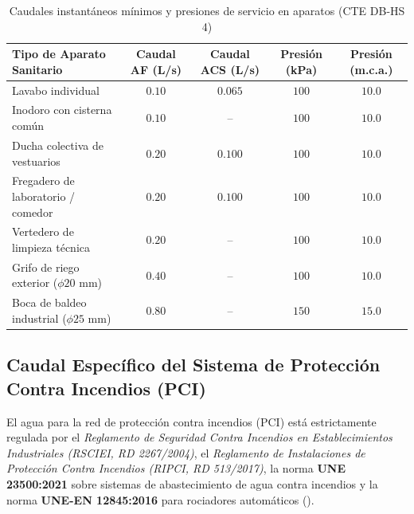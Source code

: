 \documentclass{report}
\begin{document}
\begin{table}[H]
    \centering
    \small
    \renewcommand{\arraystretch}{1.20}
    \caption{Caudales instantáneos mínimos y presiones de servicio en aparatos (CTE DB-HS 4)}
    \label{tab:caudales_aparatos_norma}
    \begin{tabularx}{\textwidth}{@{}X c c c c@{}}
        \toprule
        \textbf{Tipo de Aparato Sanitario} & \textbf{Caudal AF (L/s)} & \textbf{Caudal ACS (L/s)} & \textbf{Presión (kPa)} & \textbf{Presión (m.c.a.)} \\
        \midrule
        Lavabo individual & $0.10$ & $0.065$ & $100$ & $10.0$ \\
        Inodoro con cisterna común & $0.10$ & -- & $100$ & $10.0$ \\
        Ducha colectiva de vestuarios & $0.20$ & $0.100$ & $100$ & $10.0$ \\
        Fregadero de laboratorio / comedor & $0.20$ & $0.100$ & $100$ & $10.0$ \\
        Vertedero de limpieza técnica & $0.20$ & -- & $100$ & $10.0$ \\
        Grifo de riego exterior ($\phi 20\text{ mm}$) & $0.40$ & -- & $100$ & $10.0$ \\
        Boca de baldeo industrial ($\phi 25\text{ mm}$) & $0.80$ & -- & $150$ & $15.0$ \\
        \bottomrule
    \end{tabularx}
\end{table}

\subsection{Caudal Específico del Sistema de Protección Contra Incendios (PCI)}

El agua para la red de protección contra incendios (PCI) está estrictamente regulada por el \textit{Reglamento de Seguridad Contra Incendios en Establecimientos Industriales (RSCIEI, RD 2267/2004)}, el \textit{Reglamento de Instalaciones de Protección Contra Incendios (RIPCI, RD 513/2017)}, la norma \textbf{UNE 23500:2021} sobre sistemas de abastecimiento de agua contra incendios y la norma \textbf{UNE-EN 12845:2016} para rociadores automáticos (\cite{RD_513_2017, UNE_23500_2021, UNE_EN_12845_2016}).
\end{document}
